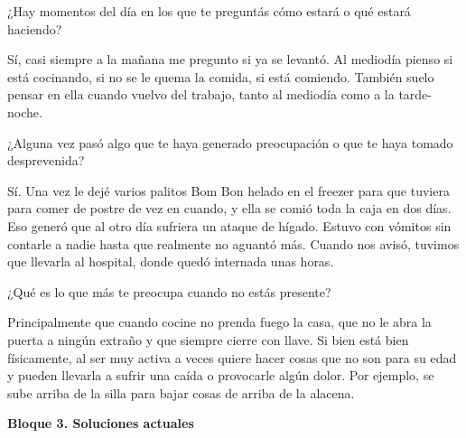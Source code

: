 \begin{description}[leftmargin=0cm, labelsep=0.5cm]

    \item[\textbf{Entrevistador:}] ¿Hay momentos del día en los que te preguntás cómo estará o qué estará haciendo?

    \item[\textbf{Entrevistada:}] Sí, casi siempre a la mañana me pregunto si ya se levantó.
    Al mediodía pienso si está cocinando, si no se le quema la comida, si está comiendo.
    También suelo pensar en ella cuando vuelvo del trabajo, tanto al mediodía como a la tarde-noche.

    \item[\textbf{Entrevistador:}] ¿Alguna vez pasó algo que te haya generado preocupación o que te haya tomado desprevenida?

    \item[\textbf{Entrevistada:}] Sí.
    Una vez le dejé varios palitos Bom Bon helado en el freezer para que tuviera para comer de postre de vez en cuando, y ella se comió toda la caja en dos días.
    Eso generó que al otro día sufriera un ataque de hígado.
    Estuvo con vómitos sin contarle a nadie hasta que realmente no aguantó más.
    Cuando nos avisó, tuvimos que llevarla al hospital, donde quedó internada unas horas.

    \item[\textbf{Entrevistador:}] ¿Qué es lo que más te preocupa cuando no estás presente?

    \item[\textbf{Entrevistada:}] Principalmente que cuando cocine no prenda fuego la casa, que no le abra la puerta a ningún extraño y que siempre cierre con llave.
    Si bien está bien físicamente, al ser muy activa a veces quiere hacer cosas que no son para su edad y pueden llevarla a sufrir una caída o provocarle algún dolor.
    Por ejemplo, se sube arriba de la silla para bajar cosas de arriba de la alacena.

\end{description}

\bigskip
\textbf{Bloque 3. Soluciones actuales}

